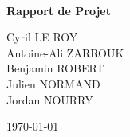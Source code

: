 \documentclass{exia_report}
\begin{document}
\begin{titlepage}
	\begin{center}

		\hfill \\[5cm]
		{ \huge \bfseries Rapport de Projet }
		\vfill
		\begin{minipage}{0.4\textwidth}
			\begin{center}
				\large
				Cyril LE ROY \\
				Antoine-Ali ZARROUK \\
				Benjamin ROBERT \\
				Julien NORMAND \\
				Jordan NOURRY
			\end{center}
		\end{minipage}

		{ \vfill \large \today }

	\end{center}
\end{titlepage}

\clearpage
\tableofcontents

\clearpage


\clearpage


\clearpage


\clearpage

\end{document}
